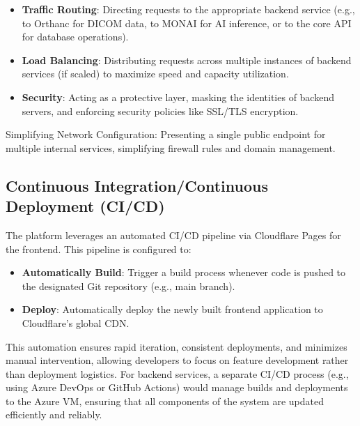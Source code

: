 \begin{itemize}
    \item \textbf{Traffic Routing}: Directing requests to the appropriate backend service (e.g., to Orthanc for DICOM data, to MONAI for AI inference, or to the core API for database operations).
    \item \textbf{Load Balancing}: Distributing requests across multiple instances of backend services (if scaled) to maximize speed and capacity utilization.
    \item \textbf{Security}: Acting as a protective layer, masking the identities of backend servers, and enforcing security policies like SSL/TLS encryption.
\end{itemize}

Simplifying Network Configuration: Presenting a single public endpoint for multiple internal services, simplifying firewall rules and domain management.

\subsection{Continuous Integration/Continuous Deployment (CI/CD)}
The platform leverages an automated CI/CD pipeline via Cloudflare Pages for the frontend. This pipeline is configured to:

\begin{itemize}
    \item \textbf{Automatically Build}: Trigger a build process whenever code is pushed to the designated Git repository (e.g., main branch).
    \item \textbf{Deploy}: Automatically deploy the newly built frontend application to Cloudflare's global CDN.
\end{itemize}
This automation ensures rapid iteration, consistent deployments, and minimizes manual intervention, allowing developers to focus on feature development rather than deployment logistics. For backend services, a separate CI/CD process (e.g., using Azure DevOps or GitHub Actions) would manage builds and deployments to the Azure VM, ensuring that all components of the system are updated efficiently and reliably.


